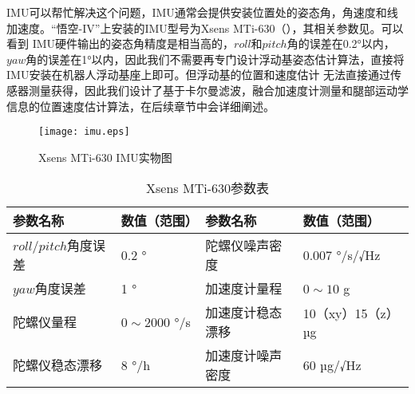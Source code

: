 IMU可以帮忙解决这个问题，IMU通常会提供安装位置处的姿态角，角速度和线加速度。“悟空-IV”上安装的IMU型号为Xsens MTi-630（），其相关参数见。可以看到
IMU硬件输出的姿态角精度是相当高的，$roll$和$pitch$角的误差在0.2°以内，$yaw$角的误差在1°以内，因此我们不需要再专门设计浮动基姿态估计算法，直接将IMU安装在机器人浮动基座上即可。但浮动基的位置和速度估计
无法直接通过传感器测量获得，因此我们设计了基于卡尔曼滤波，融合加速度计测量和腿部运动学信息的位置速度估计算法，在后续章节中会详细阐述。
\begin{figure}[htbp]
    \centering
    \texttt{[image: imu.eps]}
    \caption{\label{fig:imu}Xsens MTi-630 IMU实物图}
\end{figure}
\begin{table}[htbp]
	\centering
	\caption{Xsens MTi-630参数表}
	\label{tab:imu_data}
	\begin{tabular}{m{4cm}<{\centering}m{2.5cm}<{\centering}m{4cm}<{\centering}m{4cm}<{\centering}}
		\toprule  %
		参数名称   &数值（范围） & 参数名称 &数值（范围）  \\
		\midrule  %
		$roll/pitch$角度误差    & 0.2 ° & 陀螺仪噪声密度 & 0.007 °/s/√Hz \\
		$yaw$角度误差 &  1 ° & 加速度计量程 & $0\sim10$ g\\
		陀螺仪量程 & $0\sim2000$ °/s & 加速度计稳态漂移 & 10（xy）15（z） µg \\
        陀螺仪稳态漂移 & 8 °/h & 加速度计噪声密度 & 60 µg/√Hz\\
		\bottomrule %
	\end{tabular}
\end{table}


